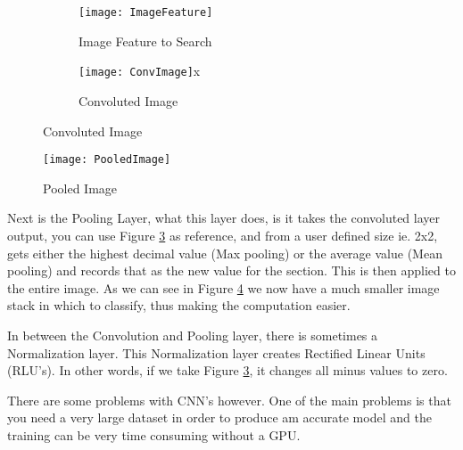 \begin{figure}
    \caption{Image Convolution}  
    \begin{subfigure}[b]{0.4\textwidth}
          \texttt{[image: ImageFeature]}
          \caption{Image Feature to Search}
          \label{fig:feature}
      \end{subfigure}
      \begin{subfigure}[b]{0.4\textwidth}
           \texttt{[image: ConvImage]}x
           \caption{Convoluted Image}
           \label{fig:convoluted}
      \end{subfigure}
\end{figure}
\begin{figure}
    \texttt{[image: PooledImage]}
    \caption{Pooled Image}
    \label{fig:pooled}
\end{figure}
Next is the Pooling Layer, what this layer does, is it takes the convoluted
layer output, you can use Figure \ref{fig:convoluted} as reference, and from a
user defined size ie. 2x2, gets either the highest decimal value (Max pooling)
or the average value (Mean pooling) and records that as the new value for the
section. This is then applied to the entire image. As we can see in Figure
\ref{fig:pooled} we now have a much smaller image stack in which to classify,
thus making the computation easier.

In between the Convolution and Pooling layer, there is sometimes a Normalization
layer. This Normalization layer creates Rectified Linear Units (RLU's). In other
words, if we take Figure \ref{fig:convoluted}, it changes all minus values to
zero.

There are some problems with CNN's however. One of the main problems is that you
need a very large dataset in order to produce am accurate model and the training
can be very time consuming without a GPU.